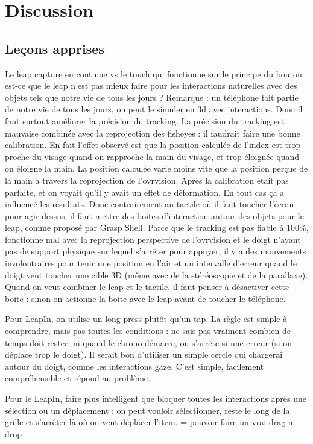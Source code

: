 \section{Discussion}
\subsection{Leçons apprises}
Le leap capture en continue vs le touch qui fonctionne sur le principe du bouton : est-ce que le leap n'est pas mieux faire pour les interactions naturelles avec des objets tels que notre vie de tous les jours ? Remarque : un téléphone fait partie de notre vie de tous les jours, on peut le simuler en 3d avec interactions. Donc il faut surtout améliorer la précision du tracking.
La précision du tracking est mauvaise combinée avec la reprojection des fisheyes : il faudrait faire une bonne calibration. En fait l'effet observé est que la position calculée de l'index est trop proche du visage quand on rapproche la main du visage, et trop éloignée quand on éloigne la main. La position calculée varie moins vite que la position perçue de la main à travers la reprojection de l'ovrvision. Après la calibration était pas parfaite, et on voyait qu'il y avait un effet de déformation. En tout cas ça a influencé les résultats.
Donc contrairement au tactile où il faut toucher l'écran pour agir dessus, il faut mettre des boites d'interaction autour des objets pour le leap, comme proposé par Grasp Shell. Parce que le tracking est pas fiable à 100\%, fonctionne mal avec la reprojection perspective de l'ovrvision et le doigt n'ayant pas de support physique sur lequel s'arrêter pour appuyer, il y a des mouvements involontraires pour tenir une position en l'air et un intervalle d'erreur quand le doigt veut toucher une cible 3D (même avec de la stéréoscopie et de la parallaxe).
Quand on veut combiner le leap et le tactile, il faut penser à désactiver cette boite : sinon on actionne la boite avec le leap avant de toucher le téléphone.

Pour LeapIn, on utilise un long press plutôt qu'un tap. La règle est simple à comprendre, mais pas toutes les conditions : ne sais pas vraiment combien de temps doit rester, ni quand le chrono démarre, ou s'arrête si une erreur (si on déplace trop le doigt). Il serait bon d'utiliser un simple cercle qui chargerai autour du doigt, comme les interactions gaze. C'est simple, facilement compréhensible et répond au problème.

Pour le LeapIn, faire plus intelligent que bloquer toutes les interactions après une sélection ou un déplacement : on peut vouloir sélectionner, reste le long de la grille et s'arrêter là où on veut déplacer l'item. = pouvoir faire un vrai drag n drop

